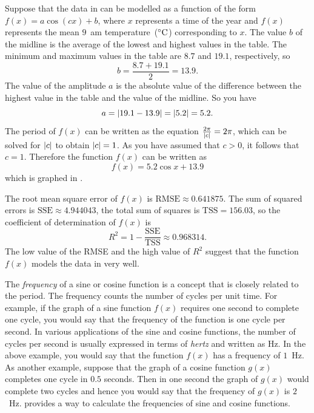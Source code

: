 \documentclass[a4paper,oneside,12pt]{article}
\begin{document}
{\begin{solution}
Suppose that the data in
 can be modelled as a
function of the form $f(x) = a \cos(cx) + b$, where $x$ represents a
time of the year and $f(x)$ represents the mean $9$~am
temperature~(${}^{\circ}\textrm{C}$) corresponding to $x$.  The value $b$ of the
midline is the average of the lowest and highest values in the table.
The minimum and maximum values in the table are $8.7$ and $19.1$,
respectively, so
\[
b
=
\frac{8.7 + 19.1}{2}
=
13.9.
\]
The value of the amplitude $a$ is the absolute value of the difference
between the highest value in the table and the value of the midline.
So you have
\[
a
=
\lvert19.1 - 13.9\rvert
=
\lvert5.2\rvert
=
5.2.
\]
The period of $f(x)$ can be written as the equation
$\frac{2\pi}{\lvert c\rvert} = 2\pi$, which can be solved for
$\lvert c\rvert$ to obtain $\lvert c\rvert = 1$.  As you have
assumed that $c > 0$, it follows that $c = 1$.  Therefore the function
$f(x)$ can be written as
\begin{equation}
\label{eqn:trigonometric:mean_9am_temperature}
f(x)
=
5.2 \cos x + 13.9
\end{equation}
which is graphed in .

The root mean square error of $f(x)$ is
$\text{RMSE} \approx 0.641875$.  The sum of squared errors is
$\text{SSE} \approx 4.944043$, the total sum of squares is
$\text{TSS} = 156.03$, so the coefficient of determination of $f(x)$
is
\[
R^2
=
1 - \frac{\text{SSE}}{\text{TSS}}
\approx
0.968314.
\]
The low value of the RMSE and the high value of $R^2$ suggest that the
function $f(x)$ models the data in
 very well.
\end{solution}
}{}

The \emph{frequency} of a sine or cosine function is a concept that is
closely related to the period.  The frequency counts the number of
cycles per unit time.  For example, if the graph of a sine function
$f(x)$ requires one second to complete one cycle, you would say that
the frequency of the function is one cycle per second.  In various
applications of the sine and cosine functions, the number of cycles
per second is usually expressed in terms of \emph{hertz} and written
as Hz.  In the above example, you would say that the function $f(x)$
has a frequency of $1$~Hz.  As another example, suppose that the graph
of a cosine function $g(x)$ completes one cycle in $0.5$ seconds.
Then in one second the graph of $g(x)$ would complete two cycles and
hence you would say that the frequency of $g(x)$ is $2$~Hz.
 provides a way to
calculate the frequencies of sine and cosine functions.
\end{document}
